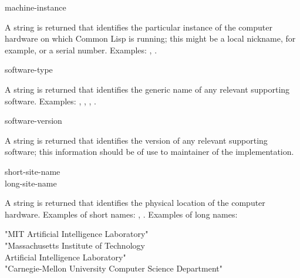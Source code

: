 \begin{defun}[Function]
machine-instance 

A string is returned that identifies the particular
instance of the computer hardware on which Common Lisp is running;
this might be a local nickname, for example, or a serial number.
Examples: , .

\end{defun}

\begin{defun}[Function]
software-type 

A string is returned that identifies the generic name of
any relevant supporting software.
Examples: , , , .

\end{defun}

\begin{defun}[Function]
software-version 

A string is returned that identifies the version of
any relevant supporting software; this information
should be of use to maintainer of the implementation.

\end{defun}

\begin{defun}[Function]
short-site-name  \\
long-site-name 

A string is returned that identifies the physical location
of the computer hardware.
Examples of short names: , .
Examples of long names:
\begin{lisp}
"MIT Artificial Intelligence Laboratory" \\
"Massachusetts Institute of Technology \\
Artificial Intelligence Laboratory" \\
"Carnegie-Mellon University Computer Science Department"
\end{lisp}

\end{defun}

